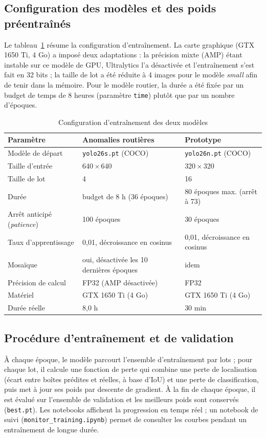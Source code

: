 \subsection{Configuration des modèles et des poids préentraînés}
Le tableau~\ref{tab:hyper} résume la configuration d'entraînement. La carte graphique (GTX 1650 Ti, 4 Go) a imposé
deux adaptations : la précision mixte (AMP) étant instable sur ce modèle de GPU, Ultralytics l'a désactivée et
l'entraînement s'est fait en 32 bits ; la taille de lot a été réduite à 4 images pour le modèle \emph{small} afin
de tenir dans la mémoire. Pour le modèle routier, la durée a été fixée par un budget de temps de 8 heures (paramètre
\texttt{time}) plutôt que par un nombre d'époques.

\begin{table}[H]
\centering\small
\caption{Configuration d'entraînement des deux modèles}
\label{tab:hyper}
\begin{tabular}{lll}
\toprule
\textbf{Paramètre} & \textbf{Anomalies routières} & \textbf{Prototype} \\
\midrule
Modèle de départ & \texttt{yolo26s.pt} (COCO) & \texttt{yolo26n.pt} (COCO) \\
Taille d'entrée & 640\,$\times$\,640 & 320\,$\times$\,320 \\
Taille de lot & 4 & 16 \\
Durée & budget de 8 h (36 époques) & 80 époques max. (arrêt à 73) \\
Arrêt anticipé (\textit{patience}) & 100 époques & 30 époques \\
Taux d'apprentissage & 0,01, décroissance en cosinus & 0,01, décroissance en cosinus \\
Mosaïque & oui, désactivée les 10 dernières époques & idem \\
Précision de calcul & FP32 (AMP désactivée) & FP32 \\
Matériel & GTX 1650 Ti (4 Go) & GTX 1650 Ti (4 Go) \\
Durée réelle & 8,0 h & 30 min \\
\bottomrule
\end{tabular}
\end{table}

\subsection{Procédure d'entraînement et de validation}
À chaque époque, le modèle parcourt l'ensemble d'entraînement par lots ; pour chaque lot, il calcule une fonction
de perte qui combine une perte de localisation (écart entre boîtes prédites et réelles, à base d'IoU) et une perte
de classification, puis met à jour ses poids par descente de gradient. À la fin de chaque époque, il est évalué sur
l'ensemble de validation et les meilleurs poids sont conservés (\texttt{best.pt}). Les notebooks affichent la
progression en temps réel ; un notebook de suivi (\texttt{monitor\_training.ipynb}) permet de consulter les courbes
pendant un entraînement de longue durée.

